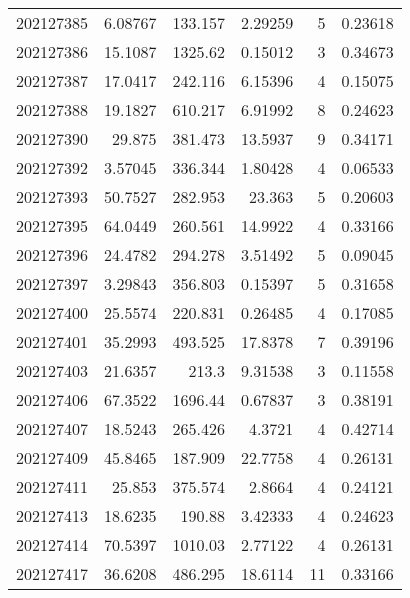 \begin{tabular}{rrrrrr}
 202127385 &          6.08767 &      133.157  &            2.29259 &           5 & 0.23618 \\
 202127386 &         15.1087  &     1325.62   &            0.15012 &           3 & 0.34673 \\
 202127387 &         17.0417  &      242.116  &            6.15396 &           4 & 0.15075 \\
 202127388 &         19.1827  &      610.217  &            6.91992 &           8 & 0.24623 \\
 202127390 &         29.875   &      381.473  &           13.5937  &           9 & 0.34171 \\
 202127392 &          3.57045 &      336.344  &            1.80428 &           4 & 0.06533 \\
 202127393 &         50.7527  &      282.953  &           23.363   &           5 & 0.20603 \\
 202127395 &         64.0449  &      260.561  &           14.9922  &           4 & 0.33166 \\
 202127396 &         24.4782  &      294.278  &            3.51492 &           5 & 0.09045 \\
 202127397 &          3.29843 &      356.803  &            0.15397 &           5 & 0.31658 \\
 202127400 &         25.5574  &      220.831  &            0.26485 &           4 & 0.17085 \\
 202127401 &         35.2993  &      493.525  &           17.8378  &           7 & 0.39196 \\
 202127403 &         21.6357  &      213.3    &            9.31538 &           3 & 0.11558 \\
 202127406 &         67.3522  &     1696.44   &            0.67837 &           3 & 0.38191 \\
 202127407 &         18.5243  &      265.426  &            4.3721  &           4 & 0.42714 \\
 202127409 &         45.8465  &      187.909  &           22.7758  &           4 & 0.26131 \\
 202127411 &         25.853   &      375.574  &            2.8664  &           4 & 0.24121 \\
 202127413 &         18.6235  &      190.88   &            3.42333 &           4 & 0.24623 \\
 202127414 &         70.5397  &     1010.03   &            2.77122 &           4 & 0.26131 \\
 202127417 &         36.6208  &      486.295  &           18.6114  &          11 & 0.33166 \\

\end{tabular}
